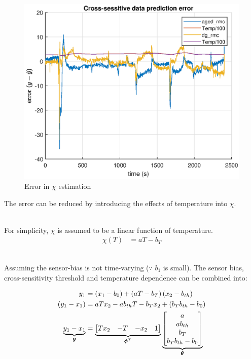 \begin{figure}[H]
    \centering
    \includegraphics[width = 0.5 \textwidth]{./figs/chi_est/chi_error.eps}
    \caption{Error in $\chi$ estimation}
\end{figure}

The error can be reduced by introducing the effects of temperature into $\chi$.


\\
For simplicity, $\chi$ is assumed to be a linear function of temperature.
\begin{align*}
    \chi(T) &= a T - b_T
\end{align*}

\\
Assuming the sensor-bias is not time-varying ($\because$ $b_1$ is small). The
sensor bias, cross-sensitivity threshold and temperature dependence can be
combined into:

\begin{align*}
    y_1 &=  \left( x_1 - b_0 \right) + \left( aT - b_{T} \right) \left( x_2 - b_{th} \right)\\
    \left( y_1 - x_1 \right) &= a T x_2 - a b_{th} T - b_{T} x_2 + (b_T b_{th} - b_0)\\
    \underbrace{y_1 - x_1}_{\pmb y} &= \underbrace{\begin{bmatrix} T x_2 & -T & -x_2 & 1 \end{bmatrix}}_{\pmb \phi^T} \underbrace{\begin{bmatrix} a \\ a b_{th} \\ b_T \\ b_T b_{th} - b_0 \end{bmatrix}}_{\pmb \theta}\\
\end{align*}

